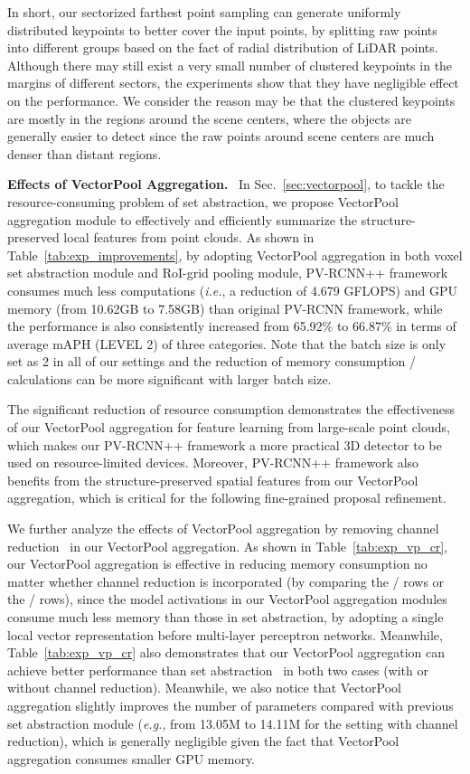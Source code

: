 \documentclass[natbib,twocolumn]{svjour3}          \smartqed  \usepackage{graphicx}
\begin{document}
In short, our sectorized farthest point sampling can generate uniformly distributed keypoints to better cover the input points,  by splitting raw points into different groups based on the fact of radial distribution of LiDAR points. 
Although there may still exist a very small number of clustered keypoints in the margins of different sectors, the experiments show that they have negligible effect on the performance. 
We consider the reason may be that the clustered keypoints are mostly in the regions around the scene centers, where the objects are generally easier to detect since the raw points around scene centers are much denser than distant regions.





\noindent
\textbf{Effects of VectorPool Aggregation.}~
In Sec.~\ref{sec:vectorpool}, to tackle the resource-consuming problem of set abstraction, we propose VectorPool aggregation module to effectively and efficiently summarize the structure-preserved local features from point clouds. 
As shown in Table~\ref{tab:exp_improvements}, by adopting VectorPool aggregation in both voxel set abstraction module and RoI-grid pooling module, PV-RCNN++ framework consumes much less computations (\emph{i.e.}, a reduction of 4.679 GFLOPS) and GPU memory (from 10.62GB to 7.58GB) than original PV-RCNN framework, while the performance is also consistently increased from 65.92\% to 66.87\% in terms of average mAPH (LEVEL 2) of three categories. Note that the batch size is only set as 2 in all of our settings and the reduction of memory consumption / calculations can be more significant with larger batch size. 

The significant reduction of resource consumption demonstrates the effectiveness of our VectorPool aggregation for feature learning from large-scale point clouds, which makes our PV-RCNN++ framework a more practical 3D detector to be used on resource-limited devices. Moreover, PV-RCNN++ framework also benefits from the structure-preserved spatial features from our VectorPool aggregation, which is critical for the following fine-grained proposal refinement. 


We further analyze the effects of VectorPool aggregation by removing channel reduction~\citep{sun2018fishnet} in our VectorPool aggregation. 
As shown in Table~\ref{tab:exp_vp_cr}, our VectorPool aggregation is effective in reducing memory consumption no matter whether channel reduction is incorporated (by comparing the  /  rows or the  /  rows), since the model activations in our VectorPool aggregation modules consume much less memory than those in set abstraction, by adopting a single local vector representation before multi-layer perceptron networks.  
Meanwhile, Table~\ref{tab:exp_vp_cr} also demonstrates that our VectorPool aggregation can achieve better performance than set abstraction~\citep{qi2017pointnet++} in both two cases (with or without channel reduction).
Meanwhile, we also notice that VectorPool aggregation slightly improves the number of parameters compared with previous set abstraction module (\emph{e.g.}, from 13.05M to 14.11M for the setting with channel reduction), which is generally negligible given the fact that VectorPool aggregation consumes smaller GPU memory.  
\end{document}
